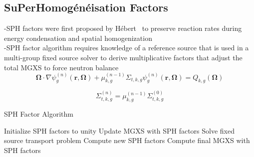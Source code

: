 \documentclass[12pt,twoside]{mitthesis-exec}
\begin{document}
\clearpage

\subsection*{SuPerHomog\'{e}n\'{e}isation Factors}

-SPH factors were first proposed by H\'{e}bert~\cite{hebert1993consistent} to preserve reaction rates during energy condensation and spatial homogenization \\
-SPH factor algorithm requires knowledge of a reference source that is used in a multi-group fixed source solver to derive multiplicative factors that adjust the total MGXS to force neutron balance \\

\begin{dmath}
\label{eqn:sph-transport-eqn-iterate}
\mathbf{\Omega} \cdot \nabla \psi_{g}^{(n)}(\mathbf{r},\mathbf{\Omega}) + \mu_{k,g}^{(n-1)}\Sigma_{t,k,g}\psi_{g}^{(n)}(\mathbf{r},\mathbf{\Omega}) = Q_{k,g}(\mathbf{\Omega})
\end{dmath}

\begin{dmath}
\label{eqn:sph-update-sigt}
\Sigma_{t,k,g}^{(n)} = \mu_{k,g}^{(n-1)}\Sigma_{t,k,g}^{(0)}
\end{dmath}

\begin{algorithm}[h]
\caption{SPH Factor Algorithm}
\label{alg:sph}
\begin{algorithmic}[1]
  \State Initialize SPH factors to unity
    \State Update MGXS with SPH factors 
    \State Solve fixed source transport problem 
    \State Compute new SPH factors
  \EndWhile
  \State Compute final MGXS with SPH factors 
\end{algorithmic}
\end{algorithm}
\end{document}
